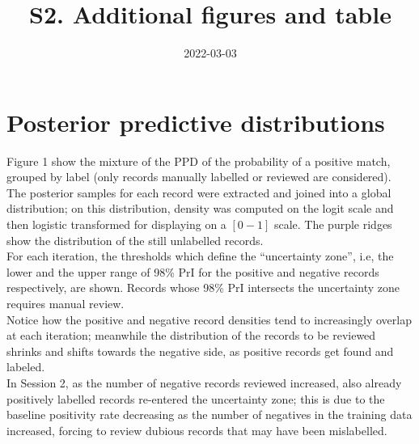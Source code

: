 \documentclass[
]{article}
\title{S2. Additional figures and table}
\author{}
\date{\vspace{-2.5em}2022-03-03}
\begin{document}
\maketitle

{
\setcounter{tocdepth}{2}
\tableofcontents
}
\newpage

\hypertarget{posterior-predictive-distributions}{%
\section{Posterior predictive
distributions}\label{posterior-predictive-distributions}}

Figure 1 show the mixture of the PPD of the probability of a positive
match, grouped by label (only records manually labelled or reviewed are
considered). The posterior samples for each record were extracted and
joined into a global distribution; on this distribution, density was
computed on the logit scale and then logistic transformed for displaying
on a \([0 - 1]\) scale. The purple ridges show the distribution of the
still unlabelled records.\\
For each iteration, the thresholds which define the ``uncertainty
zone'', i.e, the lower and the upper range of 98\% PrI for the positive
and negative records respectively, are shown. Records whose 98\% PrI
intersects the uncertainty zone requires manual review.\\
Notice how the positive and negative record densities tend to
increasingly overlap at each iteration; meanwhile the distribution of
the records to be reviewed shrinks and shifts towards the negative side,
as positive records get found and labeled.\\
In Session 2, as the number of negative records reviewed increased, also
already positively labelled records re-entered the uncertainty zone;
this is due to the baseline positivity rate decreasing as the number of
negatives in the training data increased, forcing to review dubious
records that may have been mislabelled.
\end{document}
